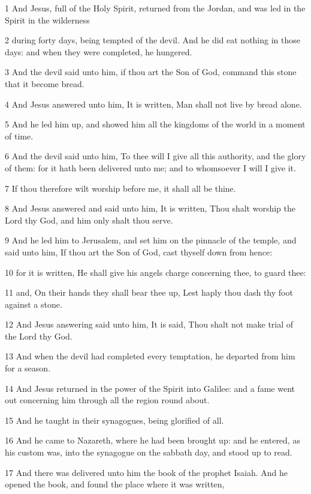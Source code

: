 \par 1 And Jesus, full of the Holy Spirit, returned from the Jordan, and was led in the Spirit in the wilderness
\par 2 during forty days, being tempted of the devil. And he did eat nothing in those days: and when they were completed, he hungered.
\par 3 And the devil said unto him, if thou art the Son of God, command this stone that it become bread.
\par 4 And Jesus answered unto him, It is written, Man shall not live by bread alone.
\par 5 And he led him up, and showed him all the kingdoms of the world in a moment of time.
\par 6 And the devil said unto him, To thee will I give all this authority, and the glory of them: for it hath been delivered unto me; and to whomsoever I will I give it.
\par 7 If thou therefore wilt worship before me, it shall all be thine.
\par 8 And Jesus answered and said unto him, It is written, Thou shalt worship the Lord thy God, and him only shalt thou serve.
\par 9 And he led him to Jerusalem, and set him on the pinnacle of the temple, and said unto him, If thou art the Son of God, cast thyself down from hence:
\par 10 for it is written, He shall give his angels charge concerning thee, to guard thee:
\par 11 and, On their hands they shall bear thee up, Lest haply thou dash thy foot against a stone.
\par 12 And Jesus answering said unto him, It is said, Thou shalt not make trial of the Lord thy God.
\par 13 And when the devil had completed every temptation, he departed from him for a season.
\par 14 And Jesus returned in the power of the Spirit into Galilee: and a fame went out concerning him through all the region round about.
\par 15 And he taught in their synagogues, being glorified of all.
\par 16 And he came to Nazareth, where he had been brought up: and he entered, as his custom was, into the synagogue on the sabbath day, and stood up to read.
\par 17 And there was delivered unto him the book of the prophet Isaiah. And he opened the book, and found the place where it was written,
